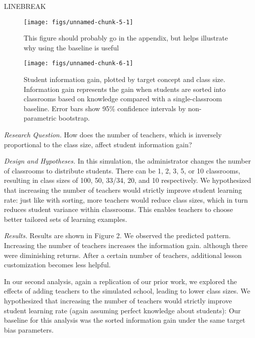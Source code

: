 \documentclass[10pt, letterpaper]{apa6}
\newenvironment{CodeChunk}{}{}
\begin{document}
LINEBREAK

\begin{CodeChunk}
\begin{figure}[t]
\texttt{[image: figs/unnamed-chunk-5-1]} \caption[This figure should probably go in the appendix, but helps illustrate why using the baseline is useful]{This figure should probably go in the appendix, but helps illustrate why using the baseline is useful}\label{fig:unnamed-chunk-5}
\end{figure}
\end{CodeChunk}

\begin{CodeChunk}
\begin{figure}[t]
\texttt{[image: figs/unnamed-chunk-6-1]} \caption[Student information gain, plotted by target concept and class size]{Student information gain, plotted by target concept and class size. Information gain represents the gain when students are sorted into classrooms based on knowledge compared with a single-classroom baseline. Error bars show 95\% confidence intervals by non-parametric bootstrap.}\label{fig:unnamed-chunk-6}
\end{figure}
\end{CodeChunk}

\emph{Research Question. } How does the number of teachers, which is
inversely proportional to the class size, affect student information
gain?

\emph{Design and Hypotheses. } In this simulation, the administrator
changes the number of classrooms to distribute students. There can be 1,
2, 3, 5, or 10 classrooms, resulting in class sizes of 100, 50, 33/34,
20, and 10 respectively. We hypothesized that increasing the number of
teachers would strictly improve student learning rate: just like with
sorting, more teachers would reduce class sizes, which in turn reduces
student variance within classrooms. This enables teachers to choose
better tailored sets of learning examples.

\emph{Results. } Results are shown in Figure 2. We observed the
predicted pattern. Increasing the number of teachers increases the
information gain. although there were diminishing returns. After a
certain number of teachers, additional lesson customization becomes less
helpful.

In our second analysis, again a replication of our prior work, we
explored the effects of adding teachers to the simulated school, leading
to lower class sizes. We hypothesized that increasing the number of
teachers would strictly improve student learning rate (again assuming
perfect knowledge about students): Our baseline for this analysis was
the sorted information gain under the same target bias parameters.
\end{document}
